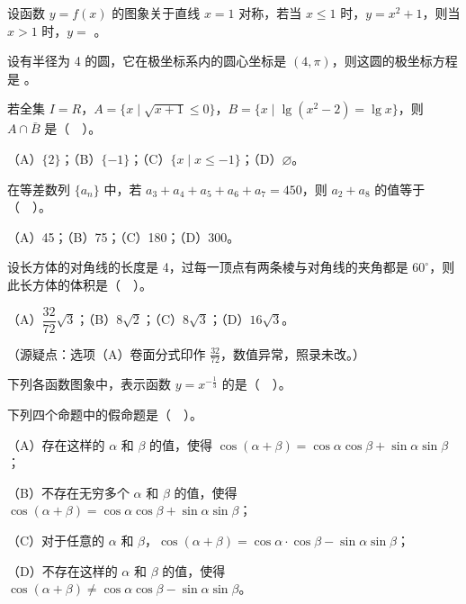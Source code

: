 \begin{question}
设函数 $y=f(x)$ 的图象关于直线 $x=1$ 对称，若当 $x\le 1$ 时，$y=x^{2}+1$，则当 $x>1$ 时，$y=$ \gkblank{}。

\end{question}
\begin{question}
设有半径为 4 的圆，它在极坐标系内的圆心坐标是 $(4,\pi)$，则这圆的极坐标方程是 \gkblank{}。

\end{question}

\begin{question}
若全集 $I=R$，$A=\{x\mid\sqrt{x+1}\le 0\}$，$B=\{x\mid\lg(x^{2}-2)=\lg x\}$，则 $A\cap\bar{B}$ 是（　）。

（A）$\{2\}$；（B）$\{-1\}$；（C）$\{x\mid x\le -1\}$；（D）$\varnothing$。

\end{question}
\begin{question}
在等差数列 $\{a_{n}\}$ 中，若 $a_{3}+a_{4}+a_{5}+a_{6}+a_{7}=450$，则 $a_{2}+a_{8}$ 的值等于（　）。

（A）45；（B）75；（C）180；（D）300。

\end{question}
\begin{question}
设长方体的对角线的长度是 4，过每一顶点有两条棱与对角线的夹角都是 $60^{\circ}$，则此长方体的体积是（　）。

（A）$\dfrac{32}{72}\sqrt{3}$；（B）$8\sqrt{2}$；（C）$8\sqrt{3}$；（D）$16\sqrt{3}$。

（源疑点：选项（A）卷面分式印作 $\frac{32}{72}$，数值异常，照录未改。）

\Needspace{0.4\textheight}
\end{question}
\begin{question}
下列各函数图象中，表示函数 $y=x^{-\frac{1}{3}}$ 的是（　）。
\nopagebreak[4]
\begin{center}\end{center}
\nopagebreak[4]
\end{question}
\begin{question}
下列四个命题中的假命题是（　）。

（A）存在这样的 $\alpha$ 和 $\beta$ 的值，使得 $\cos(\alpha+\beta)=\cos\alpha\cos\beta+\sin\alpha\sin\beta$；

（B）不存在无穷多个 $\alpha$ 和 $\beta$ 的值，使得 $\cos(\alpha+\beta)=\cos\alpha\cos\beta+\sin\alpha\sin\beta$；

（C）对于任意的 $\alpha$ 和 $\beta$，$\cos(\alpha+\beta)=\cos\alpha\cdot\cos\beta-\sin\alpha\sin\beta$；

（D）不存在这样的 $\alpha$ 和 $\beta$ 的值，使得 $\cos(\alpha+\beta)\ne\cos\alpha\cos\beta-\sin\alpha\sin\beta$。

\end{question}
